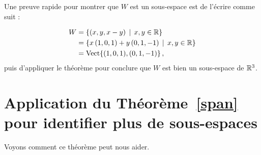 \begin{myexample} Une preuve rapide pour montrer que $W$ est un sous-espace est de l'écrire comme suit :

\begin{align*}W &= \{(x,y,x-y) \, \mid \, x,y\in \mathbb{R}\}\\ &= \{x\, (1,0,1)+ y\, (0,1,-1)\, \mid \, x,y \in \mathbb{R}\}\\&=\textrm{Vect}\{ (1,0,1),(0,1,-1)\}\,,
\end{align*}
puis d'appliquer le théorème pour conclure que $W$ est bien un sous-espace de $\mathbb{R}^3$. \end{myexample}


\section{Application du Théorème~\ref{span} pour identifier plus de sous-espaces}

Voyons comment ce théorème peut nous aider.

